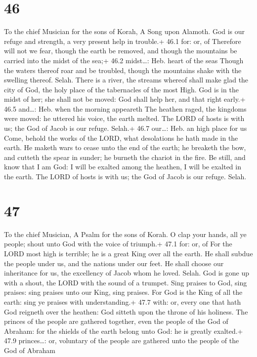 \hypertarget{section-45}{%
\section{46}\label{section-45}}

To the chief Musician for the sons of Korah, A Song upon Alamoth.
 God is our refuge and strength, a very present help in
trouble.+ 46.1 for: or, of  Therefore will not we fear,
though the earth be removed, and though the mountains be carried into
the midst of the sea;+ 46.2 midst\ldots: Heb. heart of the seas
 Though the waters thereof roar and be troubled, though the
mountains shake with the swelling thereof. Selah.  There is
a river, the streams whereof shall make glad the city of God, the holy
place of the tabernacles of the most High.  God is in the
midst of her; she shall not be moved: God shall help her, and that right
early.+ 46.5 and\ldots: Heb. when the morning appeareth  The
heathen raged, the kingdoms were moved: he uttered his voice, the earth
melted.  The LORD of hosts is with us; the God of Jacob is
our refuge. Selah.+ 46.7 our\ldots: Heb. an high place for us
 Come, behold the works of the LORD, what desolations he
hath made in the earth.  He maketh wars to cease unto the
end of the earth; he breaketh the bow, and cutteth the spear in sunder;
he burneth the chariot in the fire.  Be still, and know
that I am God: I will be exalted among the heathen, I will be exalted in
the earth.  The LORD of hosts is with us; the God of Jacob
is our refuge. Selah.

\hypertarget{section-46}{%
\section{47}\label{section-46}}

To the chief Musician, A Psalm for the sons of Korah.  O
clap your hands, all ye people; shout unto God with the voice of
triumph.+ 47.1 for: or, of  For the LORD most high is
terrible; he is a great King over all the earth.  He shall
subdue the people under us, and the nations under our feet. 
He shall choose our inheritance for us, the excellency of Jacob whom he
loved. Selah.  God is gone up with a shout, the LORD with
the sound of a trumpet.  Sing praises to God, sing praises:
sing praises unto our King, sing praises.  For God is the
King of all the earth: sing ye praises with understanding.+ 47.7 with:
or, every one that hath  God reigneth over the heathen: God
sitteth upon the throne of his holiness.  The princes of the
people are gathered together, even the people of the God of Abraham: for
the shields of the earth belong unto God: he is greatly exalted.+ 47.9
princes\ldots: or, voluntary of the people are gathered unto the people
of the God of Abraham

